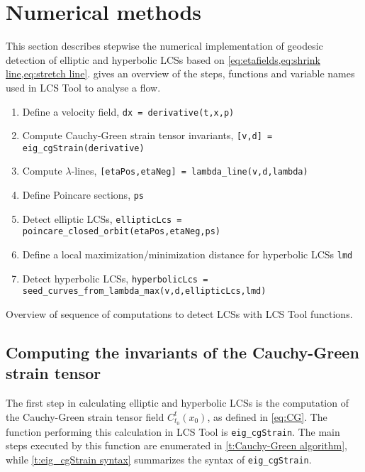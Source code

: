 \documentclass[5p]{elsarticle}
\begin{document}
\section{Numerical methods}

This section describes stepwise the numerical implementation of geodesic detection of elliptic and hyperbolic LCSs based on \cref{eq:etafields,eq:shrink line,eq:stretch line}.  gives an overview of the steps, functions and variable names used in LCS Tool to analyse a flow.

\begin{table}
\begin{enumerate}
\item Define a velocity field, \lstinline!dx = derivative(t,x,p)!
\item Compute Cauchy-Green strain tensor invariants, \lstinline![v,d] = eig_cgStrain(derivative)!
\item Compute $\lambda$-lines, \lstinline![etaPos,etaNeg] = lambda_line(v,d,lambda)!
\item Define Poincare sections, \lstinline!ps!
\item Detect elliptic LCSs, \lstinline!ellipticLcs = poincare_closed_orbit(etaPos,etaNeg,ps)!
\item Define a local maximization/minimization distance for hyperbolic LCSs \lstinline!lmd!
\item Detect hyperbolic LCSs, \lstinline!hyperbolicLcs = seed_curves_from_lambda_max(v,d,ellipticLcs,lmd)!
\end{enumerate}
\caption{Overview of sequence of computations to detect LCSs with LCS Tool functions.}
\label{t:LCS Tool overview}
\end{table}

\subsection{Computing the invariants of the Cauchy-Green strain tensor}

The first step in calculating elliptic and hyperbolic LCSs is the computation of the Cauchy-Green strain tensor field $C_{t_0}^t(x_0)$, as defined in \cref{eq:CG}. The function performing this calculation in LCS Tool is \lstinline!eig_cgStrain!. The main steps executed by this function are enumerated in \cref{t:Cauchy-Green algorithm}, while \cref{t:eig_cgStrain syntax} summarizes the syntax of \lstinline!eig_cgStrain!.
\end{document}
